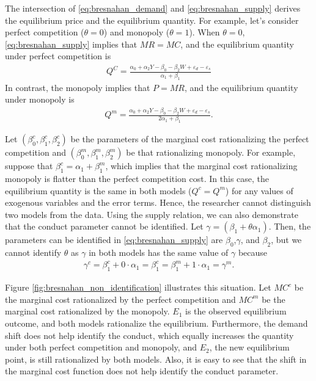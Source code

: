 \documentclass[11pt, a4paper]{article}
\theoremstyle{remark}
\begin{document}
The intersection of \eqref{eq:bresnahan_demand} and \eqref{eq:bresnahan_supply} derives the equilibrium price and the equilibrium quantity.
For example, let's consider perfect competition ($\theta = 0$) and monopoly ($\theta = 1$).
When $\theta = 0$, \eqref{eq:bresnahan_supply} implies that $MR = MC$, and the equilibrium quantity under perfect competition is
\begin{align}
    Q^C = \frac{\alpha_0 + \alpha_2 Y - \beta_0 - \beta_2 W+ \varepsilon_d - \varepsilon_s}{\alpha_1 + \beta_1}
\end{align}
In contrast, the monopoly implies that $P = MR$, and the equilibrium quantity under monopoly is
\begin{align}
    Q^m = \frac{\alpha_0 + \alpha_2 Y - \beta_0 - \beta_2 W+ \varepsilon_d - \varepsilon_s}{2\alpha_1 + \beta_1}.
\end{align}

Let $(\beta_0^c, \beta_1^c, \beta_2^c)$ be the parameters of the marginal cost rationalizing the perfect competition and $(\beta_0^m, \beta_1^m, \beta_2^m)$ be that rationalizing monopoly. 
For example, suppose that $\beta_1^c = \alpha_1 + \beta_1^m$, which implies that the marginal cost rationalizing monopoly is flatter than the perfect competition cost.
In this case, the equilibrium quantity is the same in both models ($Q^c = Q^m$) for any values of exogenous variables and the error terms. 
Hence, the researcher cannot distinguish two models from the data.
Using the supply relation, we can also demonstrate that the conduct parameter cannot be identified.
Let $\gamma = (\beta_1 + \theta \alpha_1)$.
Then, the parameters can be identified in \eqref{eq:bresnahan_supply} are $\beta_0$,$\gamma$, and $\beta_2$, but we cannot identify $\theta$ as $\gamma$ in both models has the same value of $\gamma$ because
\begin{align}
    \gamma^c = \beta_1^c + 0 \cdot \alpha_1 = \beta^c_1 = \beta_1^m + 1 \cdot \alpha_1 = \gamma^m.
\end{align}




Figure \ref{fig:bresnahan_non_identification} illustrates this situation.
Let $MC^c$ be the marginal cost rationalized by the perfect competition and $MC^m$ be the marginal cost rationalized by the monopoly.
$E_1$ is the observed equilibrium outcome, and both models rationalize the equilibrium.
Furthermore, the demand shift does not help identify the conduct, which equally increases the quantity under both perfect competition and monopoly, and $E_2$, the new equilibrium point, is still rationalized by both models.
Also, it is easy to see that the shift in the marginal cost function does not help identify the conduct parameter.
\end{document}
